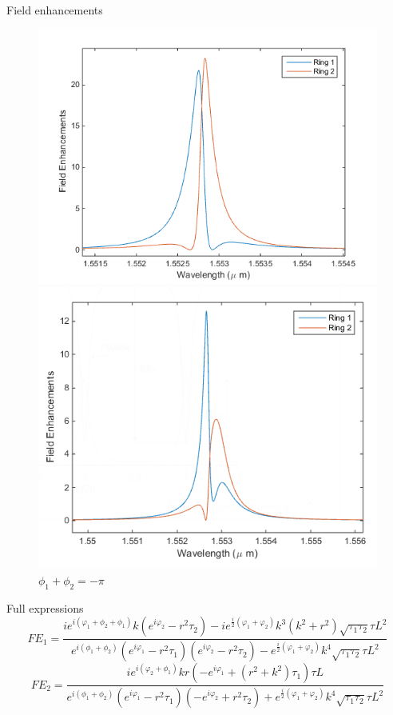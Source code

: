 \documentclass{beamer}
\begin{document}
\begin{frame}[plain]{Field enhancements}
\begin{figure}[H]
\centering
\begin{minipage}{.5\textwidth}
\centering
\includegraphics[width =\textwidth]{FE_fase_2pi}
\caption{$\phi_1+\phi_2 = 2\pi$}
\end{minipage}%
\begin{minipage}{.5\textwidth}
\centering
\includegraphics[width =.9\textwidth]{FE_fase_pi}
\caption{$\phi_1+\phi_2 = -\pi$}
\end{minipage}
\end{figure}
\end{frame}


\begin{frame}[plain]{Full expressions}
\[FE_1 = \frac{ie^{i(\varphi_1+\phi_2+\phi_1)}k (e^{i\varphi_2}-r^2\tau_2)-ie^{\frac{i}{2}(\varphi_1+\varphi_2)}k^3(k^2+r^2)\sqrt{\tau_1\tau_2}\tau L^2}{e^{i(\phi_1+\phi_2)}(e^{i\varphi_1}-r^2\tau_1)(e^{i\varphi_2}-r^2\tau_2)-e^{\frac{i}{2}(\varphi_1+\varphi_2)}k^4\sqrt{\tau_1\tau_2}\tau L^2}\]
\[FE_2 = \frac{ie^{i(\varphi_2+\phi_1)}kr (-e^{i\varphi_1}+(r^2+k^2)\tau_1)\tau L}{e^{i(\phi_1+\phi_2)}(e^{i\varphi_1}-r^2\tau_1)(-e^{i\varphi_2}+r^2\tau_2)+e^{\frac{i}{2}(\varphi_1+\varphi_2)}k^4\sqrt{\tau_1\tau_2}\tau L^2}\]
\end{frame}
\end{document}
